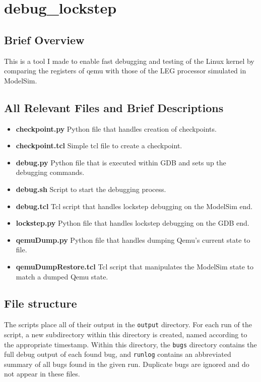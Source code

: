 \section{debug_lockstep}

\subsection{Brief Overview}

This is a tool I made to enable fast debugging and testing of the Linux kernel by comparing the registers of qemu with those of the LEG processor simulated in ModelSim.

\subsection{All Relevant Files and Brief Descriptions}

\begin{itemize}
\item \textbf{checkpoint.py} Python file that handles creation of checkpoints.
\item \textbf{checkpoint.tcl} Simple tcl file to create a checkpoint.
\item \textbf{debug.py} Python file that is executed within GDB and sets up the debugging commands.
\item \textbf{debug.sh} Script to start the debugging process.
\item \textbf{debug.tcl} Tcl script that handles lockstep debugging on the ModelSim end.
\item \textbf{lockstep.py} Python file that handles lockstep debugging on the GDB end.
\item \textbf{qemuDump.py} Python file that handles dumping Qemu's current state to file.
\item \textbf{qemuDumpRestore.tcl} Tcl script that manipulates the ModelSim state to match a dumped Qemu state.
\end{itemize}

\subsection{File structure}
The scripts place all of their output in the \texttt{output} directory. For each run of the script, a new subdirectory within this directory is created, named according to the appropriate timestamp. Within this directory, the \texttt{bugs} directory contains the full debug output of each found bug, and \texttt{runlog} contains an abbreviated summary of all bugs found in the given run. Duplicate bugs are ignored and do not appear in these files.

